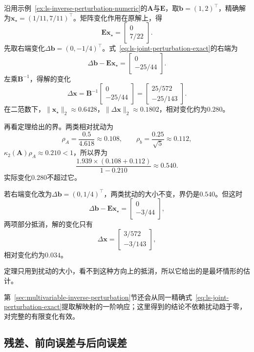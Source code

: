\begin{example}[矩阵与右端同时扰动]
\label{ex:ls-joint-perturbation-numeric}
沿用示例~\ref{ex:ls-inverse-perturbation-numeric}的$\bm A$与$\bm E$，取$\bm b=(1,2)^\top$，精确解为$\bm x_\star=(1/11,7/11)^\top$。矩阵变化作用在原解上，得
\[
 \bm E\bm x_\star=\begin{bmatrix}0\\7/22\end{bmatrix}.
\]
先取右端变化$\Delta\bm b=(0,-1/4)^\top$。式~\eqref{eq:ls-joint-perturbation-exact}的右端为
\[
 \Delta\bm b-\bm E\bm x_\star=\begin{bmatrix}0\\-25/44\end{bmatrix}.
\]
左乘$\bm B^{-1}$，得解的变化
\[
 \Delta\bm x=\bm B^{-1}\begin{bmatrix}0\\-25/44\end{bmatrix}=\begin{bmatrix}25/572\\-25/143\end{bmatrix}.
\]
在二范数下，$\lVert\bm x_\star\rVert_2\approx0.6428$，$\lVert\Delta\bm x\rVert_2\approx0.1802$，相对变化约为$0.280$。

再看定理给出的界。两类相对扰动为
\[
 \rho_A=\frac{0.5}{4.618}\approx0.108,\qquad \rho_b=\frac{0.25}{\sqrt5}\approx0.112,
\]
$\kappa_2(\bm A)\rho_A\approx0.210<1$，所以界为
\[
 \frac{1.939\times(0.108+0.112)}{1-0.210}\approx0.540 .
\]
实际变化$0.280$不超过它。

若右端变化改为$\Delta\bm b=(0,1/4)^\top$，两类扰动的大小不变，界仍是$0.540$。但这时
\[
 \Delta\bm b-\bm E\bm x_\star=\begin{bmatrix}0\\-3/44\end{bmatrix},
\]
两项部分抵消，解的变化只有
\[
 \Delta\bm x=\begin{bmatrix}3/572\\-3/143\end{bmatrix},
\]
相对变化约为$0.034$。

定理只用到扰动的大小，看不到这种方向上的抵消，所以它给出的是最坏情形的估计。
\end{example}

第~\ref{sec:multivariable-inverse-perturbation}节还会从同一精确式~\eqref{eq:ls-joint-perturbation-exact}提取解映射的一阶响应；这里得到的结论不依赖扰动趋于零，对完整的有限变化有效。

\subsection{残差、前向误差与后向误差}
\label{sec:ls-numerical-stability}

